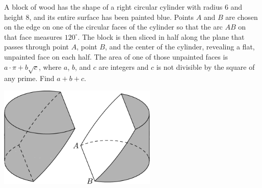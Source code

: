 A block of wood has the shape of a right circular cylinder with radius $6$ and height $8$, and its entire surface has been painted blue. Points $A$ and $B$ are chosen on the edge on one of the circular faces of the cylinder so that the arc ${AB}$ on that face measures $120^\circ$. The block is then sliced in half along the plane that passes through point $A$, point $B$, and the center of the cylinder, revealing a flat, unpainted face on each half. The area of one of those unpainted faces is $a\cdot\pi + b\sqrt{c}$, where $a$, $b$, and $c$ are integers and $c$ is not divisible by the square of any prime. Find $a+b+c$.

\begin{center}
\includegraphics[width = 75.60000000000001mm]{img/fig0.png}
\end{center}
